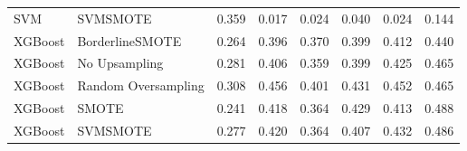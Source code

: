 \begin{tabular}{llllllll}
                            SVM &                      SVMSMOTE & 0.359 &                     0.017 &                 0.024 &                  0.040 &                                   0.024 &     0.144 \\
                        XGBoost &               BorderlineSMOTE & 0.264 &                     0.396 &                 0.370 &                  0.399 &                                   0.412 &     0.440 \\
                        XGBoost &                 No Upsampling & 0.281 &                     0.406 &                 0.359 &                  0.399 &                                   0.425 &     0.465 \\
                        XGBoost &           Random Oversampling & 0.308 &                     0.456 &                 0.401 &                  0.431 &                                   0.452 &     0.465 \\
                        XGBoost &                         SMOTE & 0.241 &                     0.418 &                 0.364 &                  0.429 &                                   0.413 &     0.488 \\
                        XGBoost &                      SVMSMOTE & 0.277 &                     0.420 &                 0.364 &                  0.407 &                                   0.432 &     0.486 \\
\bottomrule
\end{tabular}
